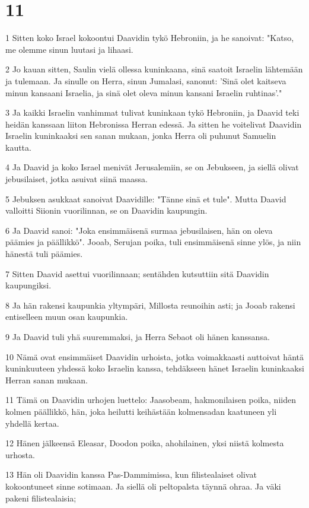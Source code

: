 \chapter{11}

\par 1 Sitten koko Israel kokoontui Daavidin tykö Hebroniin, ja he sanoivat: "Katso, me olemme sinun luutasi ja lihaasi.
\par 2 Jo kauan sitten, Saulin vielä ollessa kuninkaana, sinä saatoit Israelin lähtemään ja tulemaan. Ja sinulle on Herra, sinun Jumalasi, sanonut: 'Sinä olet kaitseva minun kansaani Israelia, ja sinä olet oleva minun kansani Israelin ruhtinas'."
\par 3 Ja kaikki Israelin vanhimmat tulivat kuninkaan tykö Hebroniin, ja Daavid teki heidän kanssaan liiton Hebronissa Herran edessä. Ja sitten he voitelivat Daavidin Israelin kuninkaaksi sen sanan mukaan, jonka Herra oli puhunut Samuelin kautta.
\par 4 Ja Daavid ja koko Israel menivät Jerusalemiin, se on Jebukseen, ja siellä olivat jebusilaiset, jotka asuivat siinä maassa.
\par 5 Jebuksen asukkaat sanoivat Daavidille: "Tänne sinä et tule". Mutta Daavid valloitti Siionin vuorilinnan, se on Daavidin kaupungin.
\par 6 Ja Daavid sanoi: "Joka ensimmäisenä surmaa jebusilaisen, hän on oleva päämies ja päällikkö". Jooab, Serujan poika, tuli ensimmäisenä sinne ylös, ja niin hänestä tuli päämies.
\par 7 Sitten Daavid asettui vuorilinnaan; sentähden kutsuttiin sitä Daavidin kaupungiksi.
\par 8 Ja hän rakensi kaupunkia yltympäri, Millosta reunoihin asti; ja Jooab rakensi entiselleen muun osan kaupunkia.
\par 9 Ja Daavid tuli yhä suuremmaksi, ja Herra Sebaot oli hänen kanssansa.
\par 10 Nämä ovat ensimmäiset Daavidin urhoista, jotka voimakkaasti auttoivat häntä kuninkuuteen yhdessä koko Israelin kanssa, tehdäkseen hänet Israelin kuninkaaksi Herran sanan mukaan.
\par 11 Tämä on Daavidin urhojen luettelo: Jaasobeam, hakmonilaisen poika, niiden kolmen päällikkö, hän, joka heilutti keihästään kolmensadan kaatuneen yli yhdellä kertaa.
\par 12 Hänen jälkeensä Eleasar, Doodon poika, ahohilainen, yksi niistä kolmesta urhosta.
\par 13 Hän oli Daavidin kanssa Pas-Dammimissa, kun filistealaiset olivat kokoontuneet sinne sotimaan. Ja siellä oli peltopalsta täynnä ohraa. Ja väki pakeni filistealaisia;
